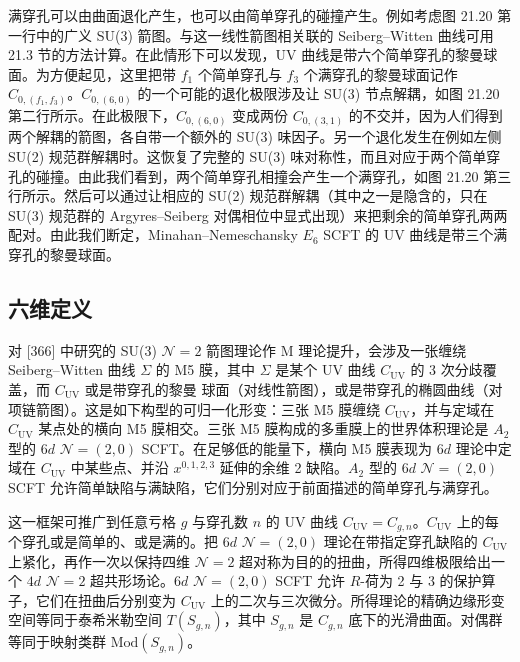满穿孔可以由曲面退化产生，也可以由简单穿孔的碰撞产生。例如考虑图 21.20 第一行中的广义 SU(3) 箭图。与这一线性箭图相关联的 Seiberg–Witten 曲线可用 21.3 节的方法计算。在此情形下可以发现，UV 曲线是带六个简单穿孔的黎曼球面。为方便起见，这里把带 $f_1$ 个简单穿孔与 $f_3$ 个满穿孔的黎曼球面记作 $C_{0,(f_1,f_3)}$。$C_{0,(6,0)}$ 的一个可能的退化极限涉及让 SU(3) 节点解耦，如图 21.20 第二行所示。在此极限下，$C_{0,(6,0)}$ 变成两份 $C_{0,(3,1)}$ 的不交并，因为人们得到两个解耦的箭图，各自带一个额外的 SU(3) 味因子。另一个退化发生在例如左侧 SU(2) 规范群解耦时。这恢复了完整的 SU(3) 味对称性，而且对应于两个简单穿孔的碰撞。由此我们看到，两个简单穿孔相撞会产生一个满穿孔，如图 21.20 第三行所示。然后可以通过让相应的 SU(2) 规范群解耦（其中之一是隐含的，只在 SU(3) 规范群的 Argyres–Seiberg 对偶相位中显式出现）来把剩余的简单穿孔两两配对。由此我们断定，Minahan–Nemeschansky $E_6$ SCFT 的 UV 曲线是带三个满穿孔的黎曼球面。

\subsection{六维定义}

对 [366] 中研究的 SU(3) $\mathcal{N}=2$ 箭图理论作 M 理论提升，会涉及一张缠绕 Seiberg–Witten 曲线 $\Sigma$ 的 M5 膜，其中 $\Sigma$ 是某个 UV 曲线 $C_{\mathrm{UV}}$ 的 3 次分歧覆盖，而 $C_{\mathrm{UV}}$ 或是带穿孔的黎曼
球面（对线性箭图），或是带穿孔的椭圆曲线（对项链箭图）。这是如下构型的可归一化形变：三张 M5 膜缠绕 $C_{\mathrm{UV}}$，并与定域在 $C_{\mathrm{UV}}$ 某点处的横向 M5 膜相交。三张 M5 膜构成的多重膜上的世界体积理论是 $A_2$ 型的 $6d$ $\mathcal{N}=(2,0)$ SCFT。在足够低的能量下，横向 M5 膜表现为 $6d$ 理论中定域在 $C_{\mathrm{UV}}$ 中某些点、并沿 $x^{0,1,2,3}$ 延伸的余维 2 缺陷。$A_2$ 型的 $6d$ $\mathcal{N}=(2,0)$ SCFT 允许简单缺陷与满缺陷，它们分别对应于前面描述的简单穿孔与满穿孔。

这一框架可推广到任意亏格 $g$ 与穿孔数 $n$ 的 UV 曲线 $C_{\mathrm{UV}}=C_{g,n}$。$C_{\mathrm{UV}}$ 上的每个穿孔或是简单的、或是满的。把 $6d$ $\mathcal{N}=(2,0)$ 理论在带指定穿孔缺陷的 $C_{\mathrm{UV}}$ 上紧化，再作一次以保持四维 $\mathcal{N}=2$ 超对称为目的的扭曲，所得四维极限给出一个 $4d$ $\mathcal{N}=2$ 超共形场论。$6d$ $\mathcal{N}=(2,0)$ SCFT 允许 $R$-荷为 2 与 3 的保护算子，它们在扭曲后分别变为 $C_{\mathrm{UV}}$ 上的二次与三次微分。所得理论的精确边缘形变空间等同于泰希米勒空间 $T(S_{g,n})$，其中 $S_{g,n}$ 是 $C_{g,n}$ 底下的光滑曲面。对偶群等同于映射类群 $\mathrm{Mod}(S_{g,n})$。

